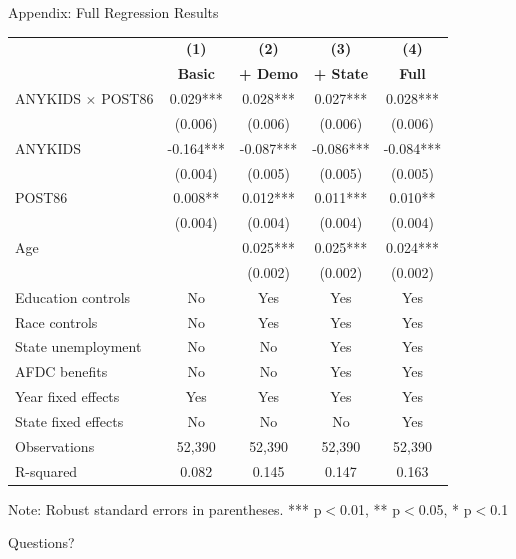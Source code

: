 \documentclass[aspectratio=169]{beamer}
\begin{document}
\begin{frame}{Appendix: Full Regression Results}
\begin{table}
\centering
\scriptsize
\begin{tabular}{lcccc}
\toprule
& \textbf{(1)} & \textbf{(2)} & \textbf{(3)} & \textbf{(4)} \\
& \textbf{Basic} & \textbf{+ Demo} & \textbf{+ State} & \textbf{Full} \\
\midrule
ANYKIDS $\times$ POST86 & 0.029*** & 0.028*** & 0.027*** & 0.028*** \\
 & (0.006) & (0.006) & (0.006) & (0.006) \\
\addlinespace
ANYKIDS & -0.164*** & -0.087*** & -0.086*** & -0.084*** \\
 & (0.004) & (0.005) & (0.005) & (0.005) \\
\addlinespace
POST86 & 0.008** & 0.012*** & 0.011*** & 0.010** \\
 & (0.004) & (0.004) & (0.004) & (0.004) \\
\addlinespace
Age & & 0.025*** & 0.025*** & 0.024*** \\
 & & (0.002) & (0.002) & (0.002) \\
\addlinespace
Education controls & No & Yes & Yes & Yes \\
Race controls & No & Yes & Yes & Yes \\
State unemployment & No & No & Yes & Yes \\
AFDC benefits & No & No & Yes & Yes \\
Year fixed effects & Yes & Yes & Yes & Yes \\
State fixed effects & No & No & No & Yes \\
\addlinespace
Observations & 52,390 & 52,390 & 52,390 & 52,390 \\
R-squared & 0.082 & 0.145 & 0.147 & 0.163 \\
\bottomrule
\end{tabular}
\end{table}

\vspace{0.2cm}
\tiny
Note: Robust standard errors in parentheses. *** p$<$0.01, ** p$<$0.05, * p$<$0.1
\end{frame}

\begin{frame}[standout]
\begin{center}
\Huge Questions?
\end{center}
\end{frame}
\end{document}
